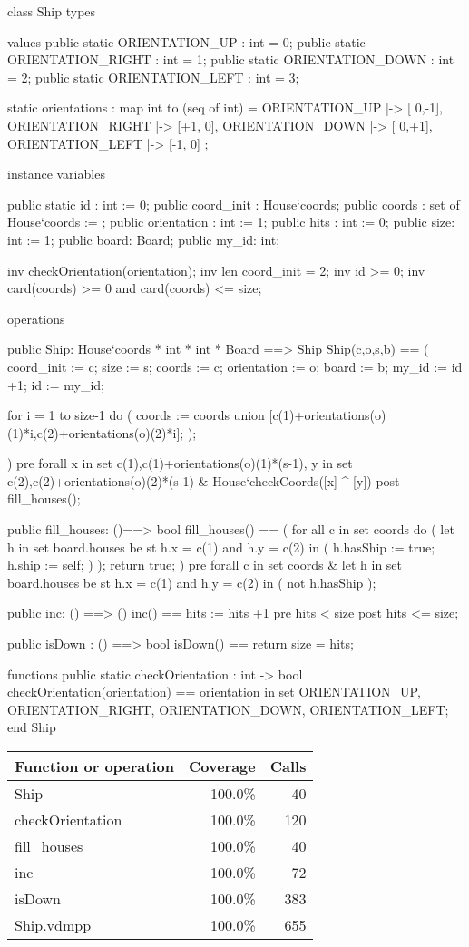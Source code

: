 \begin{vdm_al}
class Ship
 types
  
 values
  public static ORIENTATION_UP : int = 0;
  public static ORIENTATION_RIGHT : int = 1;
  public static ORIENTATION_DOWN : int = 2;
  public static ORIENTATION_LEFT : int = 3;
  
  static orientations : map int to (seq of int) = {
   ORIENTATION_UP  |-> [ 0,-1],
   ORIENTATION_RIGHT |-> [+1, 0],
   ORIENTATION_DOWN |-> [ 0,+1],
   ORIENTATION_LEFT |-> [-1, 0]
  };

 instance variables
 
  public static id : int := 0;
  public coord_init : House`coords;
  public coords : set of House`coords := {};
  public orientation : int := 1;
  public hits : int := 0;
  public size: int := 1;
  public board: Board;
  public my_id: int;
  
  inv checkOrientation(orientation);
  inv len coord_init = 2;
  inv id >= 0;
  inv card(coords) >= 0 and card(coords) <= size;
 
 operations
 
 public Ship: House`coords * int * int * Board ==> Ship
 Ship(c,o,s,b) == 
 (
  coord_init := c;
  size := s;
  coords := {c};
  orientation := o;
  board := b;
  my_id := id +1;
  id := my_id;
  
  for i = 1 to size-1 do ( 
   coords := coords union {[c(1)+orientations(o)(1)*i,c(2)+orientations(o)(2)*i]};
  );
  
 )
 pre forall x in set {c(1),c(1)+orientations(o)(1)*(s-1)}, y in set {c(2),c(2)+orientations(o)(2)*(s-1)} &
   House`checkCoords([x] ^ [y])
 post fill_houses();
 
 public fill_houses: ()==> bool
  fill_houses() ==
  (
   for all c in set coords do
   (
    let h in set board.houses be st h.x = c(1) and h.y = c(2) in
    (
     h.hasShip := true;
     h.ship := self;
    )
   );
   return true;
  )
 pre forall c in set coords &
  let h in set board.houses be st h.x = c(1) and h.y = c(2) in
  (
   not h.hasShip
  );

 public inc: () ==> ()
  inc() == hits := hits +1
 pre hits < size
 post hits <= size;
 
 public isDown : () ==> bool
  isDown() == return size = hits;
  
 functions
  public static checkOrientation : int -> bool
   checkOrientation(orientation) ==
    orientation in set {ORIENTATION_UP, ORIENTATION_RIGHT, ORIENTATION_DOWN, ORIENTATION_LEFT};
end Ship
\end{vdm_al}
\bigskip
\begin{longtable}{|l|r|r|}
\hline
Function or operation & Coverage & Calls \\
\hline
\hline
Ship & 100.0\% & 40 \\
\hline
checkOrientation & 100.0\% & 120 \\
\hline
fill\_houses & 100.0\% & 40 \\
\hline
inc & 100.0\% & 72 \\
\hline
isDown & 100.0\% & 383 \\
\hline
\hline
Ship.vdmpp & 100.0\% & 655 \\
\hline
\end{longtable}

